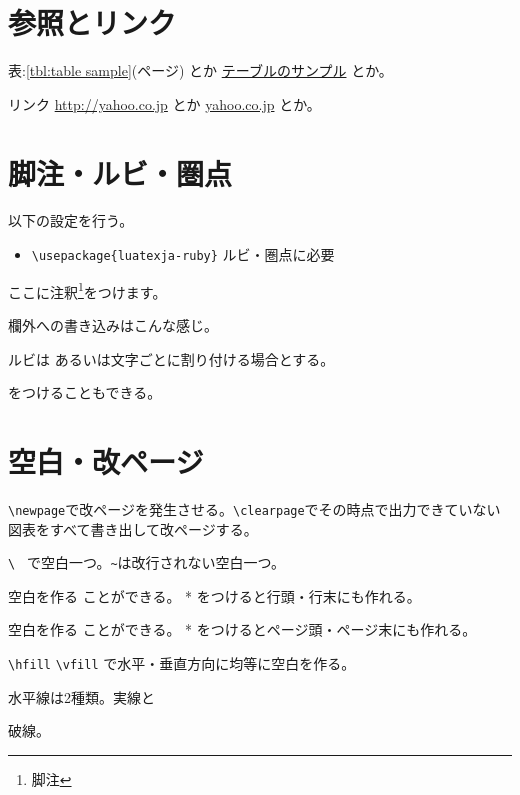 \documentclass[draft]{jlreq} %
\begin{document}
\section{参照とリンク}

表:\ref{tbl:table sample}(\pageref{tbl:table sample}ページ) とか
\hyperref[tbl:table sample]{テーブルのサンプル} とか。

リンク \url{http://yahoo.co.jp} とか \href{http://yahoo.co.jp}{yahoo.co.jp} とか。


\section{脚注・ルビ・圏点}

以下の設定を行う。
\begin{itemize}
 \item \verb|\usepackage{luatexja-ruby}| ルビ・圏点に必要
\end{itemize}

ここに注釈\footnote{脚注}をつけます。

欄外への書き込みはこんな感じ。

ルビは  あるいは文字ごとに割り付ける場合とする。

をつけることもできる。

\section{空白・改ページ}

\verb|\newpage|で改ページを発生させる。\verb|\clearpage|でその時点で出力できていない図表をすべて書き出して改ページする。

\verb|\ | で空白一つ。\verb|~|は改行されない空白一つ。

空白を作る \hspace{5 \zw} ことができる。 * をつけると行頭・行末にも作れる。

空白を作る \vspace{5 \baselineskip} ことができる。 * をつけるとページ頭・ページ末にも作れる。

\verb|\hfill| \verb|\vfill| で水平・垂直方向に均等に空白を作る。

水平線は2種類。\hrulefill 実線と

\dotfill 破線。 \dotfill
\end{document}
